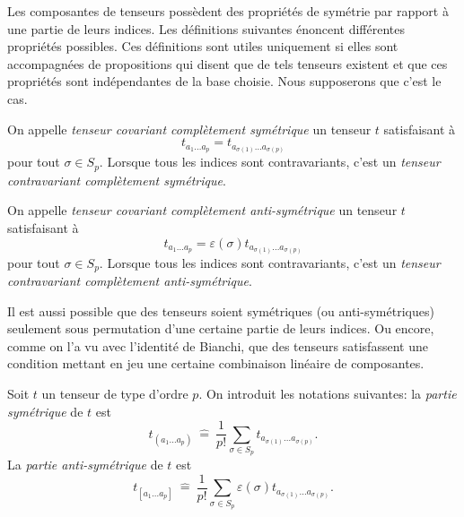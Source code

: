 \documentclass[a4paper,11pt]{report}
\begin{document}
                Les composantes de tenseurs possèdent des propriétés de symétrie par rapport à une partie de leurs indices. Les définitions suivantes énoncent différentes propriétés possibles. Ces définitions sont utiles uniquement si elles sont accompagnées de propositions qui disent que de tels tenseurs existent et que ces propriétés sont indépendantes de la base choisie. Nous supposerons que c'est le cas.
                
                \begin{defn}
                    On appelle \textit{tenseur covariant complètement symétrique} un tenseur $t$ satisfaisant à
                    \begin{equation}
                            t_{a_1\dots a_p} = t_{a_{\sigma(1)}\dots a_{\sigma(p)}}
                    \end{equation}
                    pour tout $\sigma\in S_p$. Lorsque tous les indices sont contravariants, c'est un \textit{tenseur contravariant complètement symétrique}.
                \end{defn}
                
                \begin{defn}
                    On appelle \textit{tenseur covariant complètement anti-symétrique} un tenseur $t$ satisfaisant à
                    \begin{equation}
                            t_{a_1\dots a_p} = \varepsilon(\sigma)t_{a_{\sigma(1)}\dots a_{\sigma(p)}}
                    \end{equation}
                    pour tout $\sigma\in S_p$. Lorsque tous les indices sont contravariants, c'est un \textit{tenseur contravariant complètement anti-symétrique}.
                \end{defn}
                
                Il est aussi possible que des tenseurs soient symétriques (ou anti-symétriques) seulement sous permutation d'une certaine partie de leurs indices. Ou encore, comme on l'a vu avec l'identité de Bianchi, que des tenseurs satisfassent une condition mettant en jeu une certaine combinaison linéaire de composantes.\\
                
                \begin{defn}
                    Soit $t$ un tenseur de type d'ordre $p$. On introduit les notations suivantes: la \textit{partie symétrique} de $t$ est 
                    \begin{equation}
                        t_{(a_1\dots a_p)} ~\hat{=}~ \frac{1}{p!} \sum_{\sigma\in S_p}t_{a_{\sigma(1)}\dots a_{\sigma(p)}}.
                    \end{equation}
                    La \textit{partie anti-symétrique} de $t$ est 
                    \begin{equation}
                        t_{[a_1\dots a_p]} ~\hat{=}~ \frac{1}{p!} \sum_{\sigma\in S_p}\varepsilon(\sigma) t_{a_{\sigma(1)}\dots a_{\sigma(p)}}.
                    \end{equation}
                 \end{defn}
                
\end{document}
